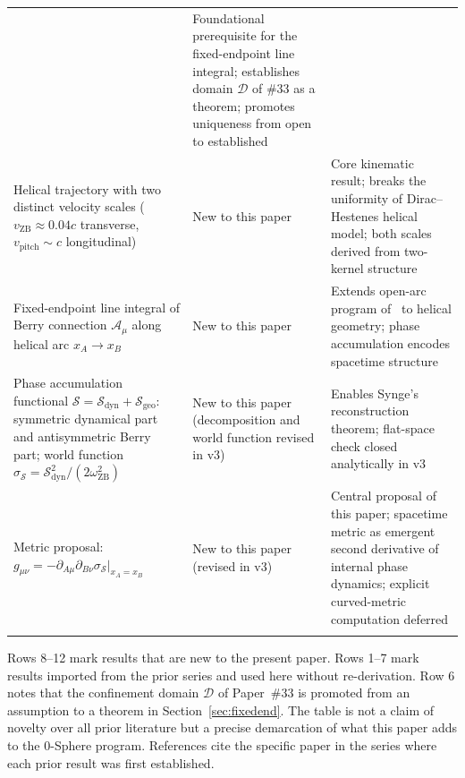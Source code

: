 \documentclass[%
 reprint, amsmath,amssymb, aps, prb, ]{revtex4-2}
\numberwithin{equation}{section}
\newcommand{\omZB}{\omega_{\text{ZB}}}
\begin{document}
\begin{table}[t!]
\begin{tabular}{p{7.0cm}p{3.5cm}p{6.5cm}}
& Foundational prerequisite for the fixed-endpoint line integral; establishes domain $\mathcal{D}$ of \#33 as a theorem; promotes uniqueness from open to established \\
\addlinespace[0.3cm]
Helical trajectory with two distinct velocity scales ($v_\mathrm{ZB}\approx 0.04c$ transverse, $v_\mathrm{pitch}\sim c$ longitudinal)
& New to this paper
& Core kinematic result; breaks the uniformity of Dirac--Hestenes helical model; both scales derived from two-kernel structure \\
\addlinespace[0.3cm]
Fixed-endpoint line integral of Berry connection $\mathcal{A}_\mu$ along helical arc $x_A\to x_B$
& New to this paper
& Extends open-arc program of~\cite{hanamura29} to helical geometry; phase accumulation encodes spacetime structure \\
\addlinespace[0.3cm]
Phase accumulation functional $\mathcal{S} = \mathcal{S}_{\mathrm{dyn}} + \mathcal{S}_{\mathrm{geo}}$: symmetric dynamical part and antisymmetric Berry part; world function $\sigma_{\mathcal{S}} = \mathcal{S}_{\mathrm{dyn}}^2/(2\omZB^2)$
& New to this paper (decomposition and world function revised in v3)
& Enables Synge's reconstruction theorem; flat-space check closed analytically in v3 \\
\addlinespace[0.3cm]
Metric proposal: $g_{\mu\nu} = -\partial_{A\mu}\partial_{B\nu}\sigma_{\mathcal{S}}\big|_{x_A=x_B}$
& New to this paper (revised in v3)
& Central proposal of this paper; spacetime metric as emergent second derivative of internal phase dynamics; explicit curved-metric computation deferred \\
\addlinespace[0.2cm]
\bottomrule
\end{tabular}
\vspace{0.2cm}
\begin{minipage}{0.95\textwidth}
\justifying\footnotesize
Rows 8--12 mark results that are new to the present paper. Rows 1--7 mark results imported from the prior series and used here without re-derivation. Row 6 notes that the confinement domain $\mathcal{D}$ of Paper~\#33 is promoted from an assumption to a theorem in Section~\ref{sec:fixedend}. The table is not a claim of novelty over all prior literature but a precise demarcation of what this paper adds to the 0-Sphere program. References cite the specific paper in the series where each prior result was first established.
\end{minipage}
\end{table}

\end{document}
